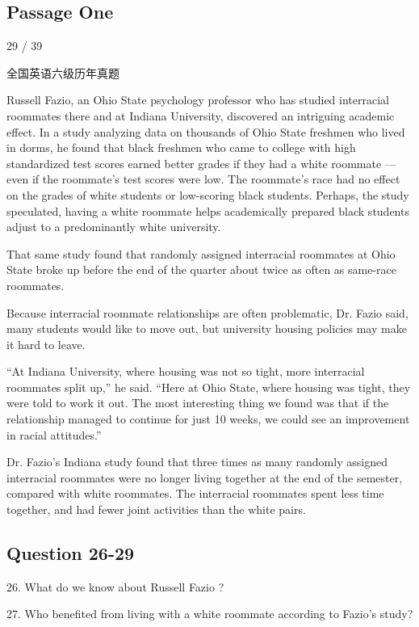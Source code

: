 \documentclass[UTF8,11pt]{ctexart}
\begin{document}
\subsection*{\textbf{Passage One}}


29 / 39


全国英语六级历年真题


Russell Fazio, an Ohio State psychology professor who has studied interracial roommates there and at Indiana University, discovered an intriguing academic effect. In a study analyzing data on thousands of Ohio State freshmen who lived in dorms, he found that black freshmen who came to college with high standardized test scores earned better grades if they had a white roommate — even if the roommate’s test scores were low. The roommate’s race had no effect on the grades of white students or low-scoring black students. Perhaps, the study speculated, having a white roommate helps academically prepared black students adjust to a predominantly white university.


That same study found that randomly assigned interracial roommates at Ohio State broke up before the end of the quarter about twice as often as same-race roommates.


Because interracial roommate relationships are often problematic, Dr. Fazio said, many students would like to move out, but university housing policies may make it hard to leave.


“At Indiana University, where housing was not so tight, more interracial roommates split up,” he said. “Here at Ohio State, where housing was tight, they were told to work it out. The most interesting thing we found was that if the relationship managed to continue for just 10 weeks, we could see an improvement in racial attitudes.”


Dr. Fazio’s Indiana study found that three times as many randomly assigned interracial roommates were no longer living together at the end of the semester, compared with white roommates. The interracial roommates spent less time together, and had fewer joint activities than the white pairs.


\subsection*{\textbf{Question 26-29}}


26. What do we know about Russell Fazio ?


27. Who benefited from living with a white roommate according to Fazio’s study?
\end{document}

